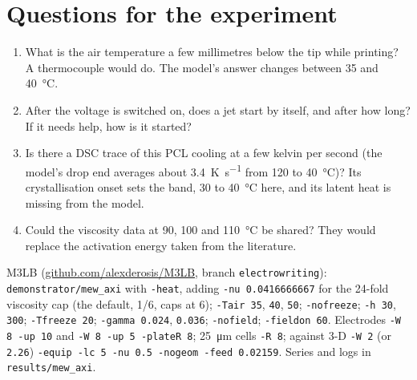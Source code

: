 \documentclass[10pt,a4paper]{article}
\begin{document}
\section{Questions for the experiment}\label{sec:questions}
\begin{enumerate}
  \item What is the air temperature a few millimetres below the tip while printing? A thermocouple would do.
    The model's answer changes between 35 and \qty{40}{\celsius}.
  \item After the voltage is switched on, does a jet start by itself, and after how long? If it needs help,
    how is it started?
  \item Is there a DSC trace of this PCL cooling at a few kelvin per second (the model's drop end averages
    about \qty{3.4}{\kelvin\per\second} from 120 to \qty{40}{\celsius})? Its crystallisation onset sets the
    band, 30 to \qty{40}{\celsius} here, and its latent heat is missing from the model.
  \item Could the viscosity data at 90, 100 and \qty{110}{\celsius} be shared? They would replace the
    activation energy taken from the literature.
\end{enumerate}

\vfill
{\footnotesize\color{inkthree}\sffamily M3LB (\href{https://github.com/alexderosis/M3LB}{github.com/alexderosis/M3LB},
branch \texttt{electrowriting}): \texttt{demonstrator/mew\_axi} with \texttt{-heat}, adding \texttt{-nu 0.0416666667}
for the 24-fold viscosity cap (the default, 1/6, caps at 6); \texttt{-Tair 35}, \texttt{40},
\texttt{50}; \texttt{-nofreeze}; \texttt{-h 30}, \texttt{300}; \texttt{-Tfreeze 20}; \texttt{-gamma 0.024},
\texttt{0.036}; \texttt{-nofield}; \texttt{-fieldon 60}. Electrodes \texttt{-W 8 -up 10} and
\texttt{-W 8 -up 5 -plateR 8}; \qty{25}{\micro\metre} cells \texttt{-R 8}; against 3-D \texttt{-W 2} (or
\texttt{2.26}) \texttt{-equip -lc 5 -nu 0.5 -nogeom -feed 0.02159}. Series and logs in
\texttt{results/mew\_axi}.\par}
\end{document}

